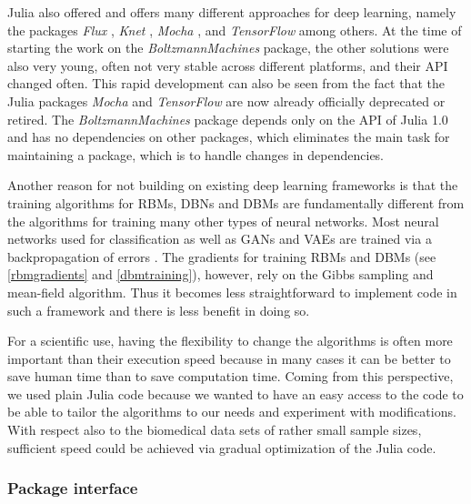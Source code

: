 \documentclass[12pt]{article}
\newcommand{\apkg}[1]{\emph{#1}}
\begin{document}
Julia also offered and offers many different approaches for deep learning, namely the packages \apkg{Flux} \citep{flux}, \apkg{Knet} \citep{knetjl}, \apkg{Mocha} \citep{mochajl}, and \apkg{TensorFlow} \citep{tensorflowjl} among others.
At the time of starting the work on the \apkg{BoltzmannMachines} package, the other solutions were also very young, often not very stable across different platforms, and their API changed often.
This rapid development can also be seen from the fact that the Julia packages \apkg{Mocha} and \apkg{TensorFlow} are now already officially deprecated or retired.
The \apkg{BoltzmannMachines} package depends only on the API of Julia 1.0 and has no dependencies on other packages, which eliminates the main task for maintaining a package, which is to handle changes in dependencies.

Another reason for not building on existing deep learning frameworks is that the training algorithms for RBMs, DBNs and DBMs are fundamentally different from the algorithms for training many other types of neural networks.
Most neural networks used for classification as well as GANs and VAEs are trained via a backpropagation of errors \citep{backpropagation}.
The gradients for training RBMs and DBMs (see \ref{rbmgradients} and \ref{dbmtraining}), however, rely on the Gibbs sampling and mean-field algorithm.
Thus it becomes less straightforward to implement code in such a framework and there is less benefit in doing so.
 
For a scientific use, having the flexibility to change the algorithms is often more important than their execution speed because in many cases it can be better to save human time than to save computation time. 
Coming from this perspective, we used plain Julia code because we wanted to have an easy access to the code to be able to tailor the algorithms to our needs and experiment with modifications.
With respect also to the biomedical data sets of rather small sample sizes, sufficient speed could be achieved via gradual optimization of the Julia code.



\subsubsection{Package interface}
\end{document}
